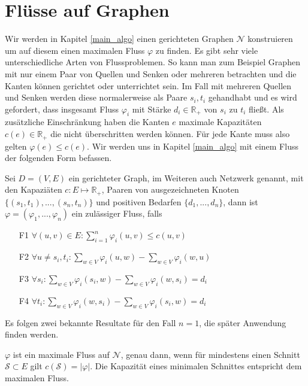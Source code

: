 \section{Flüsse auf Graphen}

Wir werden in Kapitel \ref{main_algo} einen gerichteten Graphen $\mathcal{N}$ konstruieren um auf diesem einen maximalen Fluss $\varphi$ zu finden. Es gibt sehr viele unterschiedliche Arten von Flussproblemen. So kann man zum Beispiel Graphen mit nur einem Paar von Quellen und Senken oder mehreren betrachten und die Kanten können gerichtet oder unterrichtet sein. Im Fall mit mehreren Quellen und Senken werden diese normalerweise als Paare $s_i,t_i$ gehandhabt und es wird gefordert, dass insgesamt Fluss $\varphi_i$ mit Stärke $d_i \in \mathbb{R}_+$ von $s_i$ zu $t_i$ fließt. Als zusätzliche Einschränkung haben die Kanten $e$ maximale Kapazitäten $c(e) \in \mathbb{R}_+$ die nicht überschritten werden können. Für jede Kante muss also gelten $\varphi(e) \leq c(e)$. Wir werden uns in Kapitel \ref{main_algo} mit einem Fluss der folgenden Form befassen.

\begin{definition}\label{def_multi_flow}
Sei $D=(V,E)$ ein gerichteter Graph, im Weiteren auch Netzwerk genannt, mit den Kapaziäten $c:E\mapsto\mathbb{R}_{+}$, Paaren von ausgezeichneten Knoten $\{(s_1,t_1), ... ,(s_n,t_n)\}$ und positiven Bedarfen $\{d_1, ... ,d_n\}$, dann ist $\varphi=(\varphi_1, ... ,\varphi_n)$ ein zulässiger Fluss, falls
\begin{itemize}
\item[F1] $\forall (u,v) \in E : \sum_{i=1}^{n}{\varphi_i(u,v)} \leq c(u,v) $
\item[F2] $ \forall u \neq s_i,t_i : \sum_{w \in V} \varphi_i(u,w) - \sum_{w \in V} \varphi_i(w,u) $
\item[F3] $ \forall s_i : \sum_{w \in V} \varphi_i(s_i,w) - \sum_{w \in V} \varphi_i(w,s_i) = d_i $
\item[F4] $ \forall t_i : \sum_{w \in V} \varphi_i(w,s_i) - \sum_{w \in V} \varphi_i(s_i,w) = d_i $
\end{itemize}
\end{definition}

Es folgen zwei bekannte Resultate für den Fall $n=1$, die später Anwendung finden werden.

\begin{theorem}
$\varphi$ ist ein maximale Fluss auf $\mathcal{N}$, genau dann, wenn für mindestens einen Schnitt $\mathcal{S} \subset E$ gilt $c(\mathcal{S}) = |\varphi|$. Die Kapazität eines minimalen Schnittes entspricht dem maximalen Fluss.
\end{theorem}

